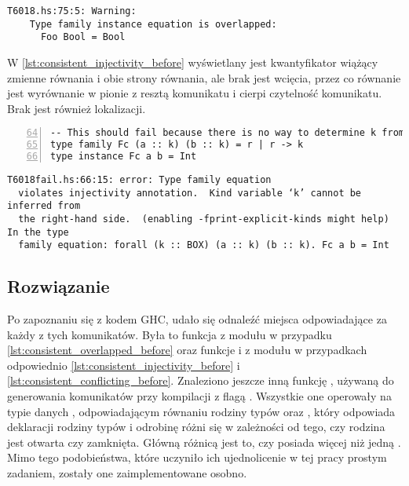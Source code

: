 \begin{lstlisting}[float,language={},label={lst:consistent_overlapped_before},
                   caption={Ostrzeżenie generowane przez kompilator w przypadku \ref{lst:consistent_overlapped_code} przed wprowadzeniem zmian.}]
T6018.hs:75:5: Warning:
    Type family instance equation is overlapped:
      Foo Bool = Bool
\end{lstlisting}

W \ref{lst:consistent_injectivity_before} wyświetlany jest kwantyfikator wiążący
zmienne równania i obie strony równania, ale brak jest wcięcia, przez co
równanie jest wyrównanie w pionie z resztą komunikatu i cierpi czytelność
komunikatu. Brak jest również lokalizacji.

\begin{lstlisting}[float,numbers=left,firstnumber=64,label={lst:consistent_injectivity_code},
                   caption={Fragment testu T6018fail z równaniem rodziny typów nie spełniającej warunku różnowartościowości.}]
-- This should fail because there is no way to determine k from the RHS
type family Fc (a :: k) (b :: k) = r | r -> k
type instance Fc a b = Int
\end{lstlisting}

\begin{lstlisting}[float,language={},label={lst:consistent_injectivity_before},
                   caption={Błąd generowany przez kompilator w przypadku \ref{lst:consistent_injectivity_code} przed wprowadzeniem zmian.}]
T6018fail.hs:66:15: error: Type family equation
  violates injectivity annotation.  Kind variable ‘k’ cannot be inferred from
  the right-hand side.  (enabling -fprint-explicit-kinds might help) In the type
  family equation: forall (k :: BOX) (a :: k) (b :: k). Fc a b = Int
\end{lstlisting}


\subsection{Rozwiązanie} %

Po zapoznaniu się z kodem GHC, udało się odnaleźć miejsca odpowiadające za każdy z
tych komunikatów. Była to funkcja  z modułu 
w przypadku \ref{lst:consistent_overlapped_before} oraz funkcje 
i  z  modułu  w przypadkach odpowiednio
\ref{lst:consistent_injectivity_before} i \ref{lst:consistent_conflicting_before}.
Znaleziono jeszcze inną funkcję
, używaną do generowania komunikatów przy kompilacji z flagą
. Wszystkie one operowały na typie danych ,
odpowiadającym równaniu rodziny typów oraz , który odpowiada
deklaracji rodziny typów i odrobinę różni się w zależności od tego, czy rodzina
jest otwarta czy zamknięta. Główną różnicą jest to, czy posiada więcej niż jedną
. Mimo tego podobieństwa, które uczyniło ich ujednolicenie
w tej pracy prostym zadaniem, zostały one zaimplementowane osobno.


